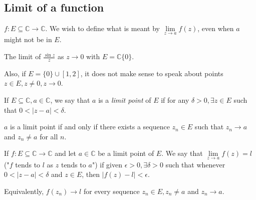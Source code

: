 \subsection{Limit of a function}
\(f:E\subseteq \mathbb{C} \to \mathbb{C}\). We wish to define what is meant by \(\lim\limits_{z \to a} f(z)\), even when \(a\) might not be in \(E\).
\begin{example}
    The limit of \(\frac{\sin z}{z}\) as \(z \to 0\) with \(E = \mathbb{C}\{0\}\).

    Also, if \(E = \{0\}\cup [1,2]\), it does not make sense to speak about points \(z\in E, z\neq 0, z\to 0\).
\end{example}
\begin{definition}
    If \(E \subseteq \mathbb{C}, a \in \mathbb{C}\), we say that \(a\) is a \textit{limit point} of \(E\) if for any \(\delta>0,\exists z \in E\) such that \(0< \left\vert z - a \right\vert < \delta\).
\end{definition}
\begin{remark}
    \(a\) is a limit point if and only if there exists a sequence \(z_n \in E\) such that \(z_n \to a\) and \(z_n \neq a\) for all \(n\).
\end{remark}
\begin{definition}
    If \(f: E \subseteq \mathbb{C}\to \mathbb{C}\) and let \(a\in \mathbb{C}\) be a limit point of \(E\). We say that \(\lim\limits_{z \to a} f(z) = l\) ("\(f\) tends to \(l\) as \(z\) tends to \(a\)") if given \(\epsilon>0, \exists \delta>0\) such that whenever \(0 < \left\vert z-a \right\vert < \delta\) and \(z \in E\), then \(\left\vert f(z) - l \right\vert < \epsilon\).

    Equivalently,  \(f(z_n) \to l\) for every sequence \(z_n \in E, z_n \neq a\) and \(z_n \to a\).
\end{definition}
